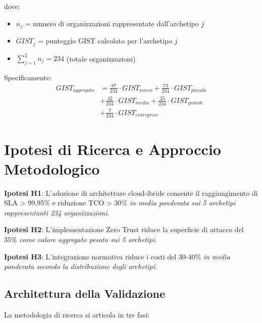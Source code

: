 dove:
\begin{itemize}
\item $n_j$ = numero di organizzazioni rappresentate dall'archetipo $j$
\item $GIST_j$ = punteggio GIST calcolato per l'archetipo $j$
\item $\sum_{j=1}^{5} n_j = 234$ (totale organizzazioni)
\end{itemize}

Specificamente:
\begin{align}
GIST_{aggregato} &= \frac{87}{234} \cdot GIST_{micro} + \frac{73}{234} \cdot GIST_{piccola} \nonumber \\
&+ \frac{42}{234} \cdot GIST_{media} + \frac{25}{234} \cdot GIST_{grande} \nonumber \\
&+ \frac{7}{234} \cdot GIST_{enterprise}
\label{eq:gist_pesi}
\end{align}

\section{\texorpdfstring{Ipotesi di Ricerca e Approccio Metodologico}{1.4 - Ipotesi di Ricerca e Approccio Metodologico}}
\label{sec:ipotesi_ricerca}

\textbf{Ipotesi H1}: L'adozione di architetture cloud-ibride consente 
il raggiungimento di SLA > 99,95\% e riduzione TCO > 30\% 
\textit{in media ponderata sui 5 archetipi rappresentanti 234 organizzazioni}.

\textbf{Ipotesi H2}: L'implementazione Zero Trust riduce la superficie 
di attacco del 35\% \textit{come valore aggregato pesato sui 5 archetipi}.

\textbf{Ipotesi H3}: L'integrazione normativa riduce i costi del 30-40\% 
\textit{in media ponderata secondo la distribuzione degli archetipi}.


\subsection{Architettura della Validazione}

La metodologia di ricerca si articola in tre fasi:

